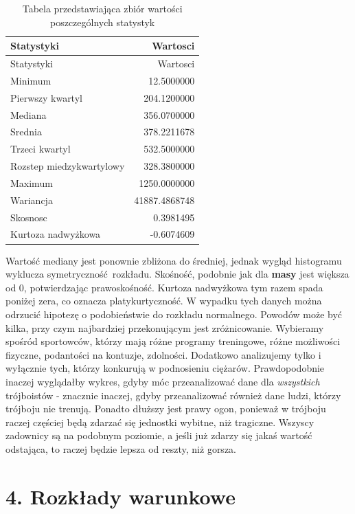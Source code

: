 \documentclass[
  letterpaper,
  DIV=11,
  numbers=noendperiod]{scrartcl}
\begin{document}
\begin{longtable}[]{@{}lr@{}}
\caption{Tabela przedstawiająca zbiór wartości poszczególnych statystyk
}\tabularnewline
\toprule\noalign{}
Statystyki & Wartosci \\
\midrule\noalign{}
\endfirsthead
\toprule\noalign{}
Statystyki & Wartosci \\
\midrule\noalign{}
\endhead
\bottomrule\noalign{}
\endlastfoot
Minimum & 12.5000000 \\
Pierwszy kwartyl & 204.1200000 \\
Mediana & 356.0700000 \\
Srednia & 378.2211678 \\
Trzeci kwartyl & 532.5000000 \\
Rozstep miedzykwartylowy & 328.3800000 \\
Maximum & 1250.0000000 \\
Wariancja & 41887.4868748 \\
Skosnosc & 0.3981495 \\
Kurtoza nadwyżkowa & -0.6074609 \\
\end{longtable}

Wartość mediany jest ponownie zbliżona do średniej, jednak wygląd
histogramu wyklucza symetryczność~rozkładu. Skośność, podobnie jak dla
\textbf{masy} jest większa od 0, potwierdzając prawoskośność. Kurtoza
nadwyżkowa tym razem spada poniżej zera, co oznacza platykurtyczność. W
wypadku tych danych można odrzucić hipotezę o podobieństwie do rozkładu
normalnego. Powodów może być kilka, przy czym najbardziej przekonującym
jest zróżnicowanie. Wybieramy spośród sportowców, którzy mają różne
programy treningowe, różne możliwości fizyczne, podantości na kontuzje,
zdolności. Dodatkowo analizujemy tylko i wyłącznie tych, którzy
konkurują w podnosieniu ciężarów. Prawdopodobnie inaczej wyglądałby
wykres, gdyby móc przeanalizować dane dla \emph{wszystkich} trójboistów
- znacznie inaczej, gdyby przeanalizować również dane ludzi, którzy
trójboju nie trenują. Ponadto dłuższy jest prawy ogon, ponieważ w
trójboju raczej częściej będą zdarzać się jednostki wybitne, niż
tragiczne. Wszyscy zadownicy są na podobnym poziomie, a jeśli już zdarzy
się jakaś wartość odstająca, to raczej będzie lepsza od reszty, niż
gorsza.

\hypertarget{rozkux142ady-warunkowe}{%
\section{4. Rozkłady warunkowe}\label{rozkux142ady-warunkowe}}
\end{document}
